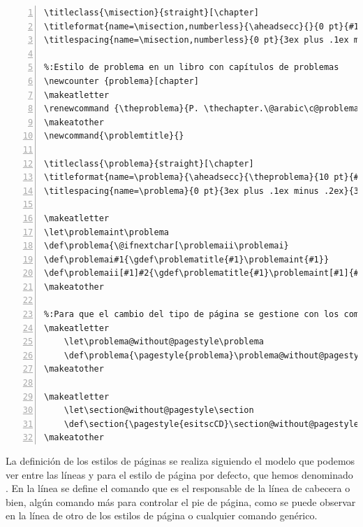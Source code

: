 \begin{lstlisting}[frame=none, numbers=left, xleftmargin=2.5em]
%:Estilo de sección sin numeración personal
\titleclass{\misection}{straight}[\chapter]        
\titleformat{name=\misection,numberless}{\aheadsecc}{}{0 pt}{#1} 
\titlespacing{name=\misection,numberless}{0 pt}{3ex plus .1ex minus .2ex}{3ex plus .1ex minus .2ex}

%:Estilo de problema en un libro con capítulos de problemas   
\newcounter {problema}[chapter]
\makeatletter
\renewcommand {\theproblema}{P. \thechapter.\@arabic\c@problema}
\makeatother
\newcommand{\problemtitle}{}

\titleclass{\problema}{straight}[\chapter]  
\titleformat{name=\problema}{\aheadsecc}{\theproblema}{10 pt}{#1}[]      
\titlespacing{name=\problema}{0 pt}{3ex plus .1ex minus .2ex}{3ex plus .1ex minus .2ex}

\makeatletter
\let\problemaint\problema
\def\problema{\@ifnextchar[\problemaii\problemai}
\def\problemai#1{\gdef\problematitle{#1}\problemaint{#1}}
\def\problemaii[#1]#2{\gdef\problematitle{#1}\problemaint[#1]{#2}}
\makeatother

%:Para que el cambio del tipo de página se gestione con los comandos
\makeatletter
	\let\problema@without@pagestyle\problema
	\def\problema{\pagestyle{problema}\problema@without@pagestyle}
\makeatother

\makeatletter
	\let\section@without@pagestyle\section
	\def\section{\pagestyle{esitscCD}\section@without@pagestyle}
\makeatother
\end{lstlisting}

La definición de los estilos de páginas se realiza siguiendo el modelo que podemos ver entre las líneas  y  para el estilo de página por defecto, que hemos denominado . En la línea  se define el comando  que es el responsable de la línea de cabecera o bien, algún comando más para controlar el pie de página, como se puede observar en la línea  de otro de los estilos de página o cualquier comando genérico.

